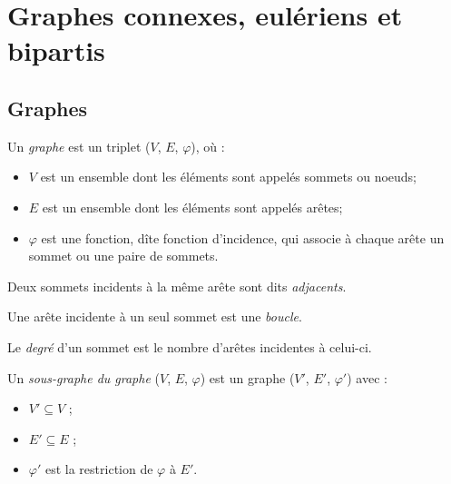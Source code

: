 \section{Graphes connexes, eulériens et bipartis }
\subsection{Graphes}

\begin{mydef}
  Un \emph{graphe} est un triplet ($V$, $E$, $\varphi$), où :
  \begin{itemize}
    \item $V$ est un ensemble dont les éléments sont appelés sommets ou noeuds;
    \item $E$ est un ensemble dont les éléments sont appelés arêtes;
    \item $\varphi$ est une fonction, dîte fonction d'incidence, qui associe à chaque arête un sommet ou une paire de sommets.
  \end{itemize}
\end{mydef}

\begin{mydef}
  Deux sommets incidents à la même arête sont dits \emph{adjacents}.
\end{mydef}

\begin{mydef}
  Une arête incidente à un seul sommet est une \emph{boucle}.
\end{mydef}

\begin{mydef}
  Le \emph{degré} d'un sommet est le nombre d'arêtes incidentes à celui-ci.
\end{mydef}

\begin{mydef}

  Un \emph{sous-graphe du graphe} ($V$, $E$, $\varphi$) est un graphe ($V'$, $E'$, $\varphi'$) avec :
  \begin{itemize}
    \item $V' \subseteq V$ ;
    \item $E' \subseteq E$ ;
    \item $\varphi'$ est la restriction de $\varphi$ à $E'$.
  \end{itemize}

\end{mydef}

